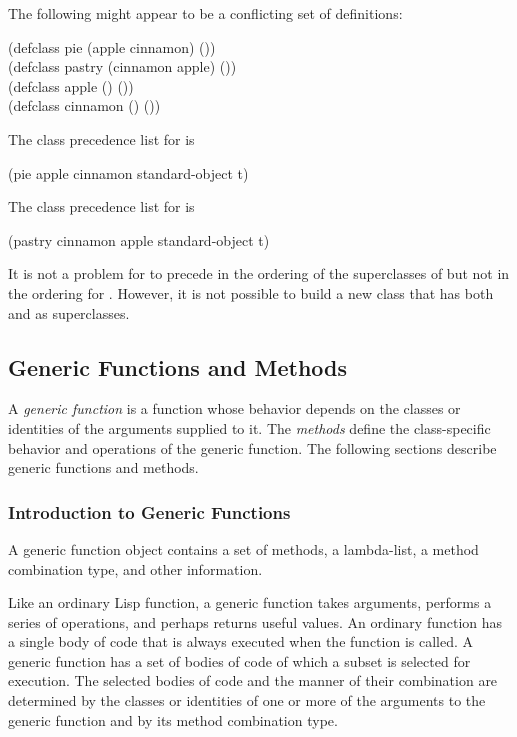 The following might appear to be a conflicting set of definitions:

\begin{lisp}
(defclass pie (apple cinnamon) ()) \\
(defclass pastry (cinnamon apple) ()) \\
(defclass apple () ()) \\
(defclass cinnamon () ())
\end{lisp}

The class precedence list for  is
\begin{lisp}
(pie apple cinnamon standard-object t)
\end{lisp}

The class precedence list for  is
\begin{lisp}
(pastry cinnamon apple standard-object t)
\end{lisp}

It is not a problem for  to precede  in the
ordering of the superclasses of  but not in the ordering for
.  However, it is not possible to build a new class that
has both  and  as superclasses.


\subsection{Generic Functions and Methods}

A \emph{generic function\/} is a function whose behavior depends on
the classes or identities of the arguments supplied to it.  The \emph{methods}
define the class-specific behavior and operations of the 
generic function. The following sections describe generic functions
and methods.

\subsubsection{Introduction to Generic Functions}

A generic function object contains a set of methods, a
lambda-list, a method combination type, and other information.

Like an ordinary Lisp function, a generic function takes arguments,
performs a series of operations, and perhaps returns useful values.
An ordinary function has a single body of code that is always executed
when the function is called.  A generic function has a set of bodies
of code of which a subset is selected for execution. The selected
bodies of code and the manner of their combination are determined by
the classes or identities of one or more of the arguments to the
generic function and by its method combination type.

